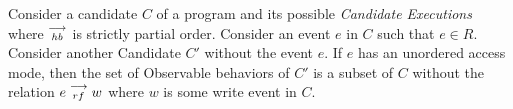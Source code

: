\begin{theorem}
    \label{ReadElim}
    Consider a candidate $C$ of a program and its possible \textit{Candidate Executions} where $\stackrel{\longrightarrow}{_\textit{hb}}$ is strictly partial order. Consider an event $e$ in $C$ such that $e \in R$. Consider another Candidate $C'$ without the event $e$. If $e$ has an unordered access mode, then the set of Observable behaviors of $C'$ is a subset of $C$ without the relation $e\stackrel{\longrightarrow}{_{rf}}w$ where $w$ is some write event in $C$.   
\end{theorem}